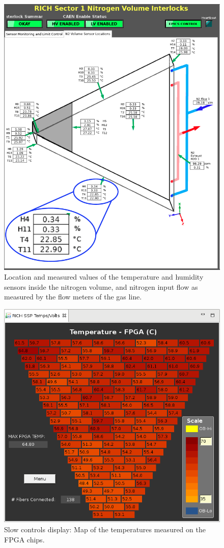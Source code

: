 \documentclass[5p,times,twocolumn]{elsarticle}
\begin{document}
\begin{figure}[t]
\begin{center}
\includegraphics[width=0.8\columnwidth]{RICH_sensors_nitrogen2.png}
\end{center}
\caption{Location and measured values of the temperature and humidity sensors inside the nitrogen volume, and nitrogen input flow as measured by the flow meters of the gas line.}
\label{Fig:RICH_sensors_nitrogen}
\end{figure}

\begin{figure}[t]
\begin{center}
\includegraphics[width=0.7\columnwidth]{FPGATempMap.png}
\end{center}
\caption{Slow controls display: Map of the temperatures measured on the FPGA chips.}
\label{fig:Online_FPGATempMap}
\end{figure}
\end{document}
